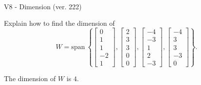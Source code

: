 \begin{exercise}
  \begin{exerciseTitle}V8 - Dimension (ver. 222)\end{exerciseTitle}
  \begin{exerciseStatement}
    Explain how to find the dimension of 
\[W=\mathrm{span}\ \left\{\left[\begin{array}{r}
0 \\
1 \\
1 \\
-2 \\
1
\end{array}\right] , \left[\begin{array}{r}
2 \\
3 \\
3 \\
0 \\
0
\end{array}\right] , \left[\begin{array}{r}
-4 \\
-3 \\
1 \\
2 \\
-3
\end{array}\right] , \left[\begin{array}{r}
-4 \\
3 \\
3 \\
-3 \\
0
\end{array}\right]\right\}.\]



  \end{exerciseStatement}
  \begin{exerciseAnswer}
   The dimension of \(W\) is  \(4\).
  


  \end{exerciseAnswer}
\end{exercise}